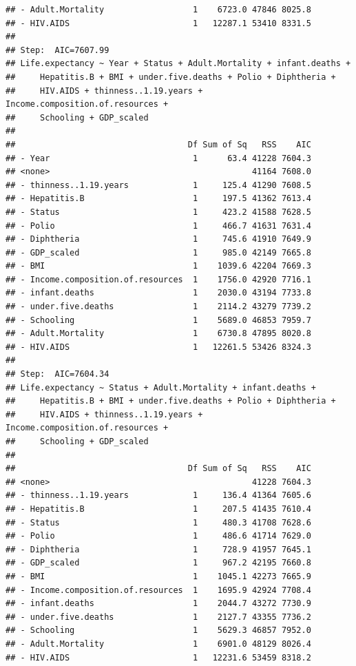 \documentclass[
]{article}
\begin{document}
\begin{verbatim}
## - Adult.Mortality                  1    6723.0 47846 8025.8
## - HIV.AIDS                         1   12287.1 53410 8331.5
## 
## Step:  AIC=7607.99
## Life.expectancy ~ Year + Status + Adult.Mortality + infant.deaths + 
##     Hepatitis.B + BMI + under.five.deaths + Polio + Diphtheria + 
##     HIV.AIDS + thinness..1.19.years + Income.composition.of.resources + 
##     Schooling + GDP_scaled
## 
##                                   Df Sum of Sq   RSS    AIC
## - Year                             1      63.4 41228 7604.3
## <none>                                         41164 7608.0
## - thinness..1.19.years             1     125.4 41290 7608.5
## - Hepatitis.B                      1     197.5 41362 7613.4
## - Status                           1     423.2 41588 7628.5
## - Polio                            1     466.7 41631 7631.4
## - Diphtheria                       1     745.6 41910 7649.9
## - GDP_scaled                       1     985.0 42149 7665.8
## - BMI                              1    1039.6 42204 7669.3
## - Income.composition.of.resources  1    1756.0 42920 7716.1
## - infant.deaths                    1    2030.0 43194 7733.8
## - under.five.deaths                1    2114.2 43279 7739.2
## - Schooling                        1    5689.0 46853 7959.7
## - Adult.Mortality                  1    6730.8 47895 8020.8
## - HIV.AIDS                         1   12261.5 53426 8324.3
## 
## Step:  AIC=7604.34
## Life.expectancy ~ Status + Adult.Mortality + infant.deaths + 
##     Hepatitis.B + BMI + under.five.deaths + Polio + Diphtheria + 
##     HIV.AIDS + thinness..1.19.years + Income.composition.of.resources + 
##     Schooling + GDP_scaled
## 
##                                   Df Sum of Sq   RSS    AIC
## <none>                                         41228 7604.3
## - thinness..1.19.years             1     136.4 41364 7605.6
## - Hepatitis.B                      1     207.5 41435 7610.4
## - Status                           1     480.3 41708 7628.6
## - Polio                            1     486.6 41714 7629.0
## - Diphtheria                       1     728.9 41957 7645.1
## - GDP_scaled                       1     967.2 42195 7660.8
## - BMI                              1    1045.1 42273 7665.9
## - Income.composition.of.resources  1    1695.9 42924 7708.4
## - infant.deaths                    1    2044.7 43272 7730.9
## - under.five.deaths                1    2127.7 43355 7736.2
## - Schooling                        1    5629.3 46857 7952.0
## - Adult.Mortality                  1    6901.0 48129 8026.4
## - HIV.AIDS                         1   12231.6 53459 8318.2
\end{verbatim}
\end{document}
